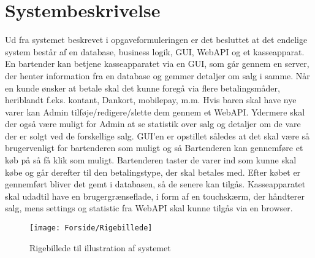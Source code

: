 \chapter{Systembeskrivelse}
Ud fra systemet beskrevet i opgaveformuleringen er det besluttet at det endelige system består af en database, business logik, \gls{GUI}, \gls{WebAPI} og et kasseapparat. 
\newline
\newline
En bartender kan betjene kasseapparatet via en GUI, som går gennem en server, der henter information fra en database og gemmer detaljer om salg i samme.
Når en kunde ønsker at betale skal det kunne foregå via flere betalingsmåder, heriblandt f.eks. kontant, Dankort, mobilepay, m.m.
\newline
\newline
Hvis baren skal have nye varer kan Admin tilføje/redigere/slette dem gennem et \gls{WebAPI}. Ydermere skal der også være muligt for Admin at se statistik over salg og detaljer om de vare der er solgt ved de forskellige salg. 
\newline
\newline
\gls{GUI}'en er opstillet således at det skal være så brugervenligt for bartenderen som muligt og så Bartenderen kan gennemføre et køb på så få klik som muligt. Bartenderen taster de varer ind som kunne skal købe og går derefter til den betalingstype, der skal betales med. Efter købet er gennemført bliver det gemt i databasen, så de senere kan tilgås. 
\newline
\newline
Kasseapparatet skal udadtil have en brugergrænseflade, i form af en touchskærm, der håndterer salg, mens settings og statistic fra \gls{WebAPI} skal kunne tilgås via en browser. 
                  
\begin{figure}[h]
    \centering
    \texttt{[image: Forside/Rigebillede]}
    \caption{Rigebillede til illustration af systemet}
    \label{fig:rig_billede}
\end{figure} 

